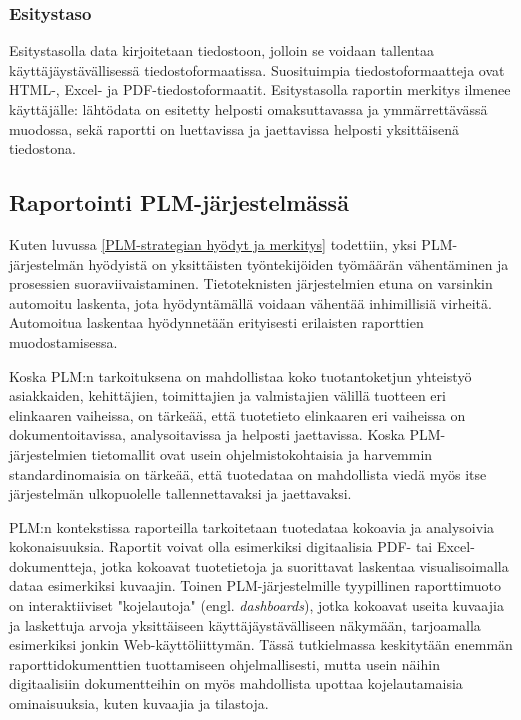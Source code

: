 \subsubsection{Esitystaso}

Esitystasolla data kirjoitetaan tiedostoon, jolloin se voidaan tallentaa käyttäjäystävällisessä tiedostoformaatissa. \cite{he_design_2010} Suosituimpia tiedostoformaatteja ovat HTML-, Excel- ja PDF-tiedostoformaatit. \cite{he_design_2010} Esitystasolla raportin merkitys ilmenee käyttäjälle: lähtödata on esitetty helposti omaksuttavassa ja ymmärrettävässä muodossa, sekä raportti on luettavissa ja jaettavissa helposti yksittäisenä tiedostona.

\subsection{Raportointi PLM-järjestelmässä} \label{Raportointi PLM-järjestelmässä}

Kuten luvussa \ref{PLM-strategian hyödyt ja merkitys} todettiin, yksi PLM-järjestelmän hyödyistä on yksittäisten työntekijöiden työmäärän vähentäminen ja prosessien suoraviivaistaminen. Tietoteknisten järjestelmien etuna on varsinkin automoitu laskenta, jota hyödyntämällä voidaan vähentää inhimillisiä virheitä. \cite{niu_organizational_2021} \cite{rakovic_digital_2022} Automoitua laskentaa hyödynnetään erityisesti erilaisten raporttien muodostamisessa.

Koska PLM:n tarkoituksena on mahdollistaa koko tuotantoketjun yhteistyö asiakkaiden, kehittäjien, toimittajien ja valmistajien välillä tuotteen eri elinkaaren vaiheissa, \cite{bouhaddou_plm_2012} on tärkeää, että tuotetieto elinkaaren eri vaiheissa on dokumentoitavissa, analysoitavissa ja helposti jaettavissa. Koska PLM-järjestelmien tietomallit ovat usein ohjelmistokohtaisia ja harvemmin standardinomaisia\cite{SritiMohamed-Foued2012PTaS} on tärkeää, että tuotedataa on mahdollista viedä myös itse järjestelmän ulkopuolelle tallennettavaksi ja jaettavaksi.

PLM:n kontekstissa raporteilla tarkoitetaan tuotedataa kokoavia ja analysoivia kokonaisuuksia. Raportit voivat olla esimerkiksi digitaalisia PDF- tai Excel-dokumentteja, jotka kokoavat tuotetietoja ja suorittavat laskentaa visualisoimalla dataa esimerkiksi kuvaajin. Toinen PLM-järjestelmille tyypillinen raporttimuoto on interaktiiviset "kojelautoja" (engl. \textit{dashboards}), jotka kokoavat useita kuvaajia ja laskettuja arvoja yksittäiseen käyttäjäystävälliseen näkymään, tarjoamalla esimerkiksi jonkin Web-käyttöliittymän. Tässä tutkielmassa keskitytään enemmän raporttidokumenttien tuottamiseen ohjelmallisesti, mutta usein näihin digitaalisiin dokumentteihin on myös mahdollista upottaa kojelautamaisia ominaisuuksia, kuten kuvaajia ja tilastoja.

